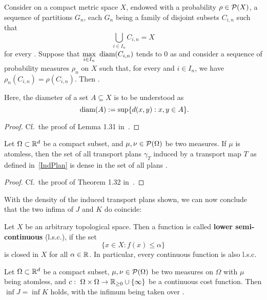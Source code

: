 \begin{lemma}\label{CompWeakConv}
	Consider on a compact metric space $X$, endowed with a probability $\rho \in \PM{X}$, a sequence of partitions $G_n$, each $G_n$ being a family of disjoint subsets $C_{i, n}$ such that \[ \bigcup\limits_{i \in I_n} C_{i, n} = X \] for every \NinN. Suppose that $\max\limits_{i \in I_n} \text{\normalfont\ diam}(C_{i, n})$ tends to $0$ as \Ninf{} and consider a sequence of probability measures $\rho_n$ on $X$ such that, for every \NinN{} and $i \in I_n$, we have $\rho_n(C_{i, n}) = \rho(C_{i, n})$. Then .
	
	Here, the diameter of a set $A \subseteq X$ is to be understood as
	\[ \text{\normalfont\ diam}(A) := \sup \{ d(x, y) : x, y \in A \}. \]
\end{lemma}

\begin{proof}
	Cf.~the proof of Lemma 1.31 in~\cite{San2015}.
\end{proof}

\begin{theorem}\label{IndPlansDense}
	Let $\Omega \subset \R^d$ be a compact subset, and $\mu, \nu \in \PM{\Omega}$ be two measures. If $\mu$ is atomless, then the set of all transport plans $\gamma_T$ induced by a transport map $T$ as defined in~\ref{IndPlan} is dense in the set of all plans \TP{\mu}{\nu}.
\end{theorem}

\begin{proof}
	Cf.~the proof of Theorem 1.32 in~\cite{San2015}.
\end{proof}

With the density of the induced transport plans shown, we can now conclude that the two infima of $J$ and $K$ do coincide:

\begin{definition}\label{lsc}
	Let $X$ be an arbitrary topological space. Then a function  is called \textbf{lower semi-continuous} (l.s.c.), if the set
	\[ \{ x \in X : f(x) \le \alpha \} \]
	is closed in $X$ for all $\alpha \in \R$. In particular, every continuous function  is also l.s.c.
\end{definition}

\begin{theorem}\label{InfCoincide}
	Let $\Omega \subset \R^d$ be a compact subset, $\mu, \nu \in \PM{\Omega}$ be two measures on $\Omega$ with $\mu$ being atomless, and $\map[c]{\Omega \times \Omega}{\RZero \cup \{ \infty \}}$ be a continuous cost function. Then $\inf J = \inf K$ holds, with the infimum being taken over \TP{\mu}{\nu}.
\end{theorem}

